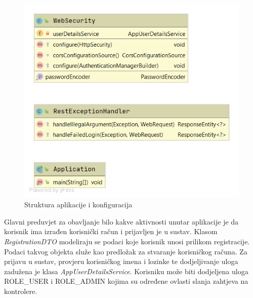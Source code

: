 				\begin{figure}[H]
					\includegraphics[scale=0.6]{slike/cs1.png} %
					\centering
					\caption{Struktura aplikacije i konfiguracija}
					
				\end{figure}
			
				\newpage
				
				Glavni preduvjet za obavljanje bilo kakve aktivnosti unutar aplikacije je da korisnik ima izrađen korisnički račun i prijavljen je u sustav. Klasom \textit{RegistrationDTO} modeliraju se podaci koje korisnik unosi prilikom registracije. Podaci takvog objekta služe kao predložak za stvaranje korisničkog računa. Za prijavu u sustav, provjeru korisničkog imena i lozinke te dodjeljivanje uloga zadužena je klasa \textit{AppUserDetailsService}. Korisniku može biti dodjeljena uloga ROLE\_USER i ROLE\_ADMIN kojima su određene ovlasti 
				slanja zahtjeva na kontrolere.
				
